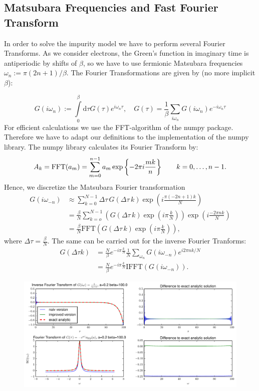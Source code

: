\begin{appendix}
\section{Matsubara Frequencies and Fast Fourier Transform}
In order to solve the impurity model we have to perform several Fourier Transforms.
As we consider electrons, the Green's function in imaginary time is antiperiodic by shifts of $\beta$, so we have to use fermionic Matsubara frequencies $ω_n:=π(2n+1)/β$.
The Fourier Transformations are given by (no more implicit $\beta$):

\begin{equation}
  G(i ω_n) := \int\limits_0^β \mathrm{d}τ G(τ) e^{i ω_n τ} ,
  \quad
  G(τ) = \frac{1}{β} \sum_{i ω_n} G(i ω_n) e^{-i ω_n τ}
\end{equation}
%
For efficient calculations we use the FFT-algorithm of the numpy package. Therefore we have to adapt our definitions to the implementation of the numpy library. The numpy library calculates its Fourier Transform by:
\begin{equation}
  A_k = \mathrm{FFT}(a_m) =  \sum_{m=0}^{n-1} a_m \exp\left\{-2\pi i{mk \over n}\right\}
   \qquad k = 0,\ldots,n-1.
\end{equation}
Hence, we discretize the Matsubara Fourier transformation
\begin{align}
  G(i ω_{-n}) &\approx \sum_{k=0}^{N-1} \Delta τ \, G(\Delta τ \, k) \exp{\left(i \frac{π (-2n+1)k}{N}\right)}\\
          &=\frac{\beta}{N} \sum_{k=o}^{N-1} \left( G(\Delta τ \, k)\exp{\left(i π \frac{k}{N}\right)}  \right)  \exp{\left(i \frac{-2 π n k}{N}\right)}\\
	  &= \frac{\beta}{N} \mathrm{FFT}\left( G(\Delta τ \, k)\exp{\left(i π \frac{k}{N}\right)}\right), \label{eq:MFFT}
\end{align}
where $\Delta τ = \frac{\beta}{N}$.
The same can be carried out for the inverse Fourier Tranforms:
\begin{align}
	G(\Delta τ k) &= \frac{N}{β} e^{-i π \frac{k}{N}}\frac{1}{N}\sum_{ω_n}G(i ω_{-n}) e^{i 2π n k/N}\\
	&= \frac{N}{β} e^{-i π \frac{k}{N}}\mathrm{IFFT}(G(iω_{-n})) \label{eq:IMFFT}.
\end{align}
\begin{figure}[h]
	\centering
	\includegraphics[width=\textwidth]{Matsubara_Fourier_fig}

\end{figure}
\end{appendix}
